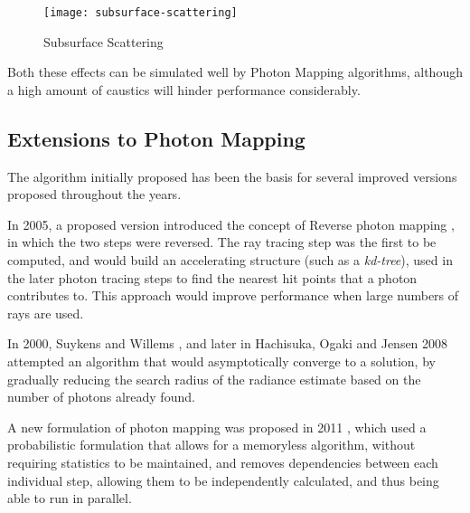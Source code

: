 \documentclass[main.tex]{subfiles}
\begin{document}
\begin{figure}[!htp]
  \centering
  \texttt{[image: subsurface-scattering]}
  \caption{Subsurface Scattering \label{fig:subscat}}
\end{figure}

Both these effects can be simulated well by Photon Mapping algorithms, although a high amount of caustics will hinder performance considerably.


\subsection{Extensions to Photon Mapping}

The algorithm initially proposed \cite{jensen1996global} has been the basis for several improved versions proposed throughout the years.

In 2005, a proposed version introduced the concept of Reverse photon mapping \cite{havran2005fast}, in which the two steps were reversed. The ray tracing step was the first to be computed, and would build an accelerating structure (such as a \textit{kd-tree}), used in the later photon tracing steps to find the nearest hit points that a photon contributes to. This approach would improve performance when large numbers of rays are used.

In 2000, Suykens and Willems \cite{suykens2000adaptive}, and later in Hachisuka, Ogaki and Jensen 2008 \cite{hachisuka2008progressive} attempted an algorithm that would asymptotically converge to a solution, by gradually reducing the search radius of the radiance estimate based on the number of photons already found.

A new formulation of photon mapping was proposed in 2011 \cite{knaus2011progressive}, which used a probabilistic formulation that allows for a memoryless algorithm, without requiring statistics to be maintained, and removes dependencies between each individual step, allowing them to be independently calculated, and thus being able to run in parallel.
\end{document}
